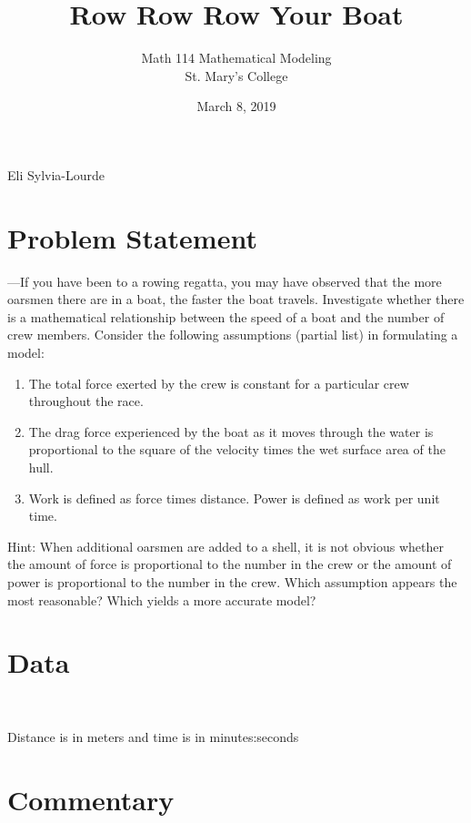 \documentclass[12pt]{article} %
\title{Row Row Row Your Boat}
\author{Math 114 Mathematical Modeling\\St. Mary's College}
\date{March 8, 2019}
\newcommand{\authors}{Eli Sylvia-Lourde}
\begin{document}
\hfill\authors %
{\let\newpage\relax\maketitle} %

\section*{Problem Statement}
—If you have been to a rowing regatta, you may have observed that the more oarsmen there are in a boat, the faster the boat travels. Investigate whether there is a mathematical relationship between the speed of a boat and the number of crew members. Consider the following assumptions (partial list) in formulating a model:

\begin{enumerate}
\item
The total force exerted by the crew is constant for a particular crew throughout the race.
\item
The drag force experienced by the boat as it moves through the water is proportional to the square of the velocity times the wet surface area of the hull.
\item
Work is defined as force times distance. Power is defined as work per unit time.
\end{enumerate}
Hint: When additional oarsmen are added to a shell, it is not obvious whether the amount of force is proportional to the number in the crew or the amount of power is proportional to the number in the crew. Which assumption appears the most reasonable? Which yields a more accurate model?

\section*{Data}
{\centering
{}
\\}

Distance is in meters and time is in minutes:seconds

\section*{Commentary}
\end{document}
